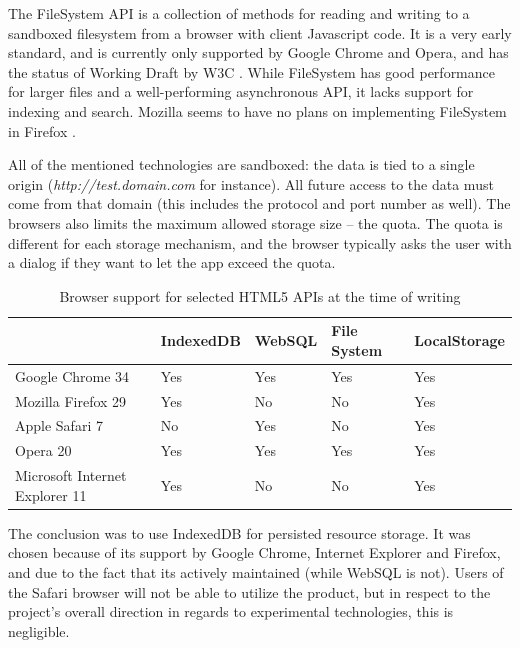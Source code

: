 The FileSystem API is a collection of methods for reading and writing to a sandboxed filesystem from a browser with client Javascript code. It is a very early standard, and is currently only supported by Google Chrome and Opera, and has the status of Working Draft by W3C \cite{FileSystem:Online}. While FileSystem has good performance for larger files and a well-performing asynchronous API, it lacks support for indexing and search. Mozilla seems to have no plans on implementing FileSystem in Firefox \cite{MozillaFileSystem:Online}.

All of the mentioned technologies are sandboxed: the data is tied to a single origin (\emph{http://test.domain.com} for instance). All future access to the data must come from that domain (this includes the protocol and port number as well). The browsers also limits the maximum allowed storage size – the quota. The quota is different for each storage mechanism, and the browser typically asks the user with a dialog if they want to let the app exceed the quota.

\begin{table}
    \begin{tabular}{|l|l|l|l|l|}
    \hline
                       & IndexedDB & WebSQL & File System & LocalStorage \\ \hline
    Google Chrome 34               & Yes       & Yes    & Yes  & Yes                      \\ \hline
    Mozilla Firefox 29             & Yes       & \cellcolor{red}No  & \cellcolor{red}No   & Yes                        \\ \hline
    Apple Safari 7                & \cellcolor{red}No        & Yes  & \cellcolor{red}No    & Yes                        \\ \hline
    Opera 20                       & Yes       & Yes    & Yes  & Yes                      \\ \hline
    Microsoft Internet Explorer 11 & Yes       & \cellcolor{red}No  & \cellcolor{red}No   & Yes                        \\ \hline
    \end{tabular}
    \caption {Browser support for selected HTML5 APIs at the time of writing}
\end{table}

The conclusion was to use IndexedDB for persisted resource storage. It was chosen because of its support by Google Chrome, Internet Explorer and Firefox, and due to the fact that its actively maintained (while WebSQL is not). Users of the Safari browser will not be able to utilize the product, but in respect to the project's overall direction in regards to experimental technologies, this is negligible.


